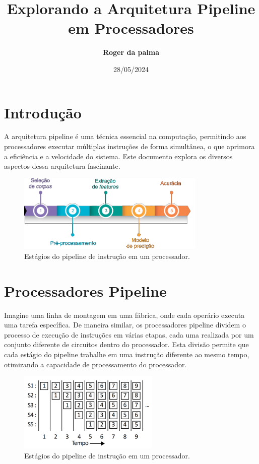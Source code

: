 \documentclass[12pt]{article}
\title{\textbf{\Huge Explorando a Arquitetura Pipeline em Processadores}}
\author{\textbf{Roger da palma}}
\date{28/05/2024}
\begin{document}
\maketitle

\section*{Introdução}

A arquitetura pipeline é uma técnica essencial na computação, permitindo aos processadores executar múltiplas instruções de forma simultânea, o que aprimora a eficiência e a velocidade do sistema. Este documento explora os diversos aspectos dessa arquitetura fascinante.

\begin{figure}[h]
\centering
\includegraphics[width=0.8\textwidth]{fig1.png}
\caption{Estágios do pipeline de instrução em um processador.}
\label{fig:pipeline_instrucao}
\end{figure}

\section*{Processadores Pipeline}

Imagine uma linha de montagem em uma fábrica, onde cada operário executa uma tarefa específica. De maneira similar, os processadores pipeline dividem o processo de execução de instruções em várias etapas, cada uma realizada por um conjunto diferente de circuitos dentro do processador. Esta divisão permite que cada estágio do pipeline trabalhe em uma instrução diferente ao mesmo tempo, otimizando a capacidade de processamento do processador.

\begin{figure}[h]
\centering
\includegraphics[width=0.6\textwidth]{fig5.png}
\caption{Estágios do pipeline de instrução em um processador.}
\label{fig:pipeline_instrucao}
\end{figure}
\end{document}
